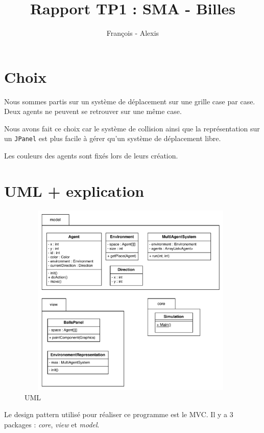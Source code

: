 \documentclass[a4paper,10pt]{article}
\title{Rapport TP1 : SMA - Billes}
\author{Fran\c{c}ois \bsc{Lepan} - Alexis \bsc{Linke}}
\begin{document}
\maketitle

\section{Choix}

Nous sommes partis sur un syst\`eme de d\'eplacement sur une grille case par case. Deux agents ne peuvent  se retrouver sur une m\^eme case.

Nous avons fait ce choix car le syst\`eme de collision ainsi que la repr\'esentation sur un \verb&JPanel& est plus facile \`a g\'erer qu'un syst\`eme de d\'eplacement libre.

Les couleurs des agents sont fix\'es lors de leurs cr\'eation.

\section{UML + explication}

\begin{figure}[ht]
\begin{center}
	\includegraphics[height=9.3cm , width=11cm]{uml/sci_uml_tp1.pdf}
\end{center}
	\caption{UML}
	\label{uml}
\end{figure}

\newpage 

Le design pattern utilis\'e pour r\'ealiser ce programme est le MVC.  Il y a 3 packages : \emph{core}, \emph{view} et \emph{model}. 
\end{document}
